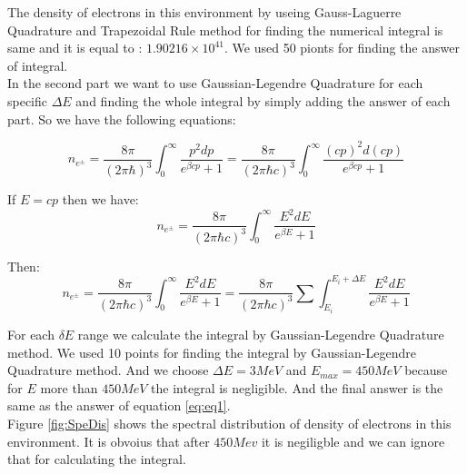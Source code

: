 \documentclass[10pt]{article}
\begin{document}
 The density of electrons in this environment by useing Gauss-Laguerre Quadrature and Trapezoidal Rule method for finding the numerical integral is same and it is equal to : $1.90216 \times 10^{41}$. We used 50 pionts for finding the answer of integral.\\

In the second part we want to use Gaussian-Legendre Quadrature for each specific $ \Delta E $ and finding the whole integral by simply adding the answer of each part. So we have the following equations:  

\begin{equation}\label{eq:eq1}
 n_{e^{\pm}} = \frac{8 \pi}{(2 \pi \hbar)^3 } \int_0^\infty \frac{p^2 dp}{e^{\beta cp}+1} = \frac{8 \pi}{(2 \pi \hbar c)^3 } \int_0^\infty \frac{(cp)^2 d(cp)}{e^{\beta cp}+1} 
\end{equation}

If $E = cp$ then we have: \\

\begin{equation}\label{eq:eq2}
 n_{e^{\pm}} = \frac{8 \pi}{(2 \pi \hbar c)^3 } \int_0^\infty \frac{E^2 dE}{e^{\beta E}+1} 
\end{equation}

Then: \\

\begin{equation}\label{eq:eq3}
 n_{e^{\pm}} = \frac{8 \pi}{(2 \pi \hbar c)^3 } \int_0^\infty \frac{E^2 dE}{e^{\beta E}+1} = \frac{8 \pi}{(2 \pi \hbar c)^3 } \sum \int_{E_i}^{E_i + \Delta E} \frac{E^2 dE}{e^{\beta E}+1}
\end{equation}

For each $\delta E$ range we calculate the integral by Gaussian-Legendre Quadrature method. We used 10 points for finding the integral by Gaussian-Legendre Quadrature method. And we choose $\Delta E = 3 MeV$ and $E_{max} = 450 MeV$ because for $E$ more than $450 MeV$ the integral is negligible. And the final answer is the same as the answer of equation \ref{eq:eq1}. \\

Figure \ref{fig:SpeDis} shows the spectral distribution of density of electrons in this environment. It is obvoius that after $450 Mev$ it is negiligble and we can ignore that for calculating the integral.\\
\end{document}
